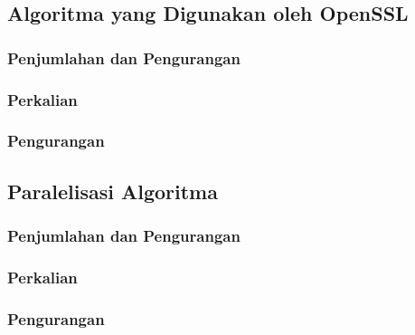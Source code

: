\subsection{Algoritma yang Digunakan oleh OpenSSL}
\subsubsection{Penjumlahan dan Pengurangan}
\subsubsection{Perkalian}
\subsubsection{Pengurangan}

\subsection{Paralelisasi Algoritma}
\subsubsection{Penjumlahan dan Pengurangan}
\subsubsection{Perkalian}
\subsubsection{Pengurangan}
